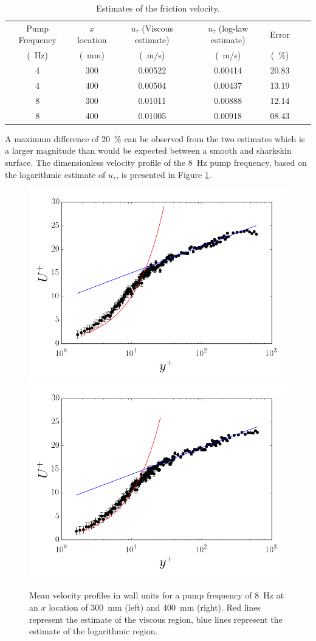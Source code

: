 \documentclass[12pt,oneside,a4paper]{article}
\begin{document}
 \begin{table}[!b]
 \centering
 \caption{Estimates of the friction velocity.}
 \label{table:experiments:UtauErrors}
 \begin{tabular}{c c c c c c c}
 \hline
 Pump Frequency	&	$x$ location	&	$u_\tau$ (Viscous estimate)	&	$u_\tau$ (log-law estimate)	&	Error	\\
(\SI{}{Hz}) & (\SI{}{mm}) & (\SI{}{m/s}) & (\SI{}{m/s}) & (\SI{}{\%})	\\
%
\hline
4	&	300 	& 0.00522 & 0.00414 & 20.83 \\
4	&	400 	& 0.00504 & 0.00437 & 13.19 \\
8	&	300 	& 0.01011 & 0.00888 & 12.14 \\
8	&	400 	& 0.01005 & 0.00918 & 08.43 \\
\hline


 \end{tabular}
 \end{table}
A maximum difference of \SI{20}{\%} can be observed from the two estimates which is a larger magnitude than would be expected between a smooth and sharkskin surface. The dimensionless velocity profile of the \SI{8}{Hz} pump frequency, based on the logarithmic estimate of $u_\tau$, is presented in Figure \ref{figure:experiments:profiles:UplusYplus}. 
%
\begin{figure}[!t]
\centering
\includegraphics[width = 0.5\linewidth]{images/LDA_profileImages/Uplus_Yplus_8Hz_300.png}\hfill \includegraphics[width = 0.5\linewidth]{images/LDA_profileImages/Uplus_Yplus_8Hz_400.png}
\caption{Mean velocity profiles in wall units for a pump frequency of \SI{8}{Hz} at an $x$ location of \SI{300}{mm} (left) and \SI{400}{mm} (right). Red lines represent the estimate of the viscous region, blue lines represent the estimate of the logarithmic region.}
\label{figure:experiments:profiles:UplusYplus}
\end{figure}
\end{document}
